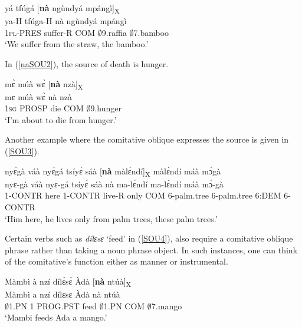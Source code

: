 \begin{exe} 
\ex\label{naSOU1}
  \glll     yá tfúgá [{\bfseries nà} ngùndyá mpángì]\textsubscript{X} \\
            ya-H tfúga-H nà ngùndyá mpángì \\
              1\textsc{pl}-PRES suffer-R COM $\emptyset$9.raffia $\emptyset$7.bamboo \\
    \trans `We suffer from the straw, the bamboo.'
\end{exe}

\noindent In (\ref{naSOU2}), the source of death is hunger.

\begin{exe} 
\ex\label{naSOU2}
  \glll  mɛ̀ múà wɛ̀ [{\bfseries nà} nzà]\textsubscript{X} \\
        mɛ múà wɛ̀ nà nzà \\
          1\textsc{sg} PROSP die COM $\emptyset$9.hunger  \\
    \trans `I'm about to die from hunger.'
\end{exe}

\noindent Another example where the comitative oblique expresses the source is given in (\ref{SOU3}).

\begin{exe} 
\ex\label{SOU3}
  \glll nyɛ̀gà váà nyɛ̀gá tsíyɛ́ sáà [{\bfseries nà} màlɛ́ndí]\textsubscript{X} màlɛ́ndí máà mɔ́gà \\
         nyɛ-gà váà nyɛ-gá tsíyɛ́ sáà nà ma-lɛ́ndí ma-lɛ́ndí máà mɔ́-gà \\
          1-CONTR here 1-CONTR live-R only COM 6-palm.tree 6-palm.tree 6:DEM 6-CONTR \\
    \trans `Him here, he lives only from palm trees, these palm trees.'
\end{exe}

Certain verbs such as {\itshape dílɛsɛ} `feed' in (\ref{SOU4}), also require a comitative oblique phrase rather than taking a noun phrase object. In such instances, one can think of the comitative's function either as manner or instrumental.

\begin{exe} 
\ex\label{SOU4}
  \glll Màmbì à nzí dílɛ̀sɛ̀ Àdà [{\bfseries nà} ntúà]\textsubscript{X}  \\
        Màmbì a nzí dílɛsɛ Àdà nà ntúà   \\
        $\emptyset$1.PN 1 PROG.PST feed $\emptyset$1.PN COM $\emptyset$7.mango   \\
    \trans `Mambi feeds Ada a mango.'
\end{exe}

